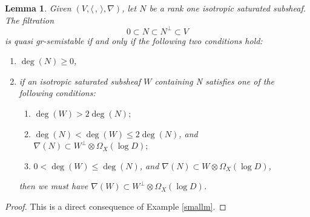 \documentclass[11pt]{article}
\numberwithin{equation}{section}
\newcommand{\grsemistable}{gr\nobreakdash-semi\-stable\xspace}
\theoremstyle{plain}
\newtheorem{lem}[thm]{Lemma}
\theoremstyle{definition}
\begin{document}
\begin{lem}\label{criterion}
Given $(V,\langle \,, \, \rangle,\nabla)$, let $N$ be a rank one isotropic saturated subsheaf. The filtration
\[
0\subset N\subset N^\perp\subset V
\]
is quasi \grsemistable if and only if the following two conditions hold:
\begin{enumerate}
\item $\deg(N)\geq 0$,

\item if an isotropic saturated subsheaf $W$ containing N satisfies one of the following conditions:
\begin{enumerate}
\item $\deg(W)>2\deg(N);$

\item $\deg(N)<\deg(W)\leq2\deg(N)$, and $\nabla(N)\subset W^\perp\otimes \Omega_X(\log D);$

\item $0<\deg(W)\leq \deg(N)$, and $\nabla(N)\subset W\otimes \Omega_X(\log D)$,
\end{enumerate}
then we must have $\nabla(W)\subset W^\perp\otimes \Omega_X(\log D)$.
\end{enumerate}
\end{lem}

\begin{proof} 
This is a direct consequence of Example \ref{smallm}.
\end{proof}
\end{document}
